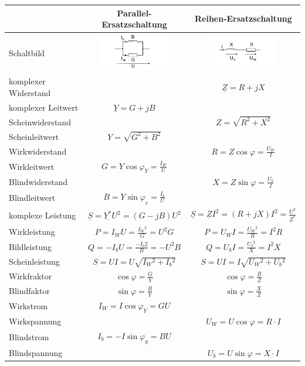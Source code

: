	\begin{centering}
			
	\begin{tabular}{|l|c|c|}
		\hline
			& Parallel-Ersatzschaltung & Reihen-Ersatzschaltung \\
		\hline
			Schaltbild & \includegraphics[width=3cm]{./images/RL_parallel.png} &
			\includegraphics[width=3cm]{./images/RL_Seriel.png}\\
		\hline
			komplexer Widerstand & & $\underline{Z}=R+jX$\\
			komplexer Leitwert & $\underline{Y}=G+jB$ &\\
		\hline
			Scheinwiderstand & & $Z=\sqrt{R^2+X^2}$\\
			Scheinleitwert & $Y=\sqrt{G^2+B^2}$ & \\
		\hline
			Wirkwiderstand & & $R=Z\cos\varphi=\frac{U_W}{I}$\\
			Wirkleitwert & $G=Y\cos\varphi_Y=\frac{I_W}{U}$&\\
		\hline
			Blindwiderstand & & $X=Z\sin\varphi=\frac{U_b}{I}$\\
			Blindleitwert & $B = Y\sin\varphi_{_Y} = \frac{I_b}{U}$&\\
		\hline
			komplexe Leistung & $\underline{S}=
			\underline{Y^*}U^2=\left(G-jB\right)U^2$& $\underline{S}=\underline{Z}I^2=\left(R+jX\right)I^2 = \frac{U^2}{\underline{Z}^{\ast}}$\\
			Wirkleistung & $P=I_W U=\frac{I{_W}{^2}}{G}=U^2G$ &
			$P=U_WI=\frac{U{_W}{^2}}{R}=I^2R$ \\
			Bildleistung & $Q=-I_bU=\frac{-I{_b}{2}}{B}=-U^2B$ & $Q = U_bI =
			\frac{U{_b}{^2}}{X}=I^2X$\\
			Scheinleistung & $S=UI=U\sqrt{I{_W}{^2}+I{_b}{^2}}$ & $S=UI =
			I\sqrt{U{_W}{^2}+U{_b}{^2}}$\\
		\hline
			Wirkfraktor & $\cos\varphi= \frac{G}{Y}$ & $\cos\varphi=\frac{R}{Z}$\\
			Blindfaktor & $\sin\varphi= \frac{B}{Y}$ & $\sin\varphi=\frac{X}{Z}$\\
		\hline
			Wirkstrom & $I_W=I\cos\varphi_Y=GU$ & \\
			Wirkspannung & & $U_W = U\cos\varphi =R \cdot I$ \\
		\hline
			Blindstrom & $I_b = -I \sin\varphi_y = BU$ & \\
			Blindspannung & & $U_b=U\sin\varphi=X\cdot I$\\
		\hline
	\end{tabular}\\
	\end{centering}

